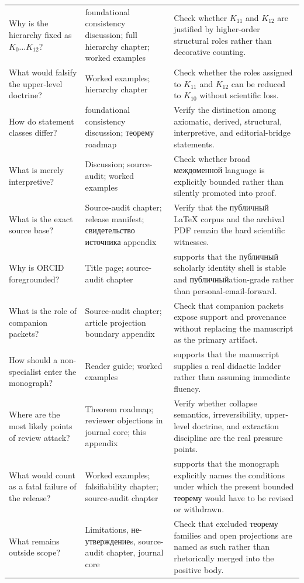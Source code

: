 \begin{longtable}{p{3.4cm} p{4.4cm} p{5.7cm}}
Why is the hierarchy fixed as \(K_0\dots K_{12}\)? & foundational consistency discussion; full hierarchy chapter; worked examples & Check whether \(K_{11}\) and \(K_{12}\) are justified by higher-order structural roles rather than decorative counting. \\
What would falsify the upper-level doctrine? & Worked examples; hierarchy chapter & Check whether the roles assigned to \(K_{11}\) and \(K_{12}\) can be reduced to \(K_{10}\) without scientific loss. \\
How do statement classes differ? & foundational consistency discussion; теорему roadmap & Verify the distinction among axiomatic, derived, structural, interpretive, and editorial-bridge statements. \\
What is merely interpretive? & Discussion; source-audit; worked examples & Check whether broad междоменной language is explicitly bounded rather than silently promoted into proof. \\
What is the exact source base? & Source-audit chapter; release manifest; свидетельство источника appendix & Verify that the публичный LaTeX corpus and the archival PDF remain the hard scientific witnesses. \\
Why is ORCID foregrounded? & Title page; source-audit chapter & supports that the публичный scholarly identity shell is stable and публичныйation-grade rather than personal-email-forward. \\
What is the role of companion packets? & Source-audit chapter; article projection boundary appendix & Check that companion packets expose support and provenance without replacing the manuscript as the primary artifact. \\
How should a non-specialist enter the monograph? & Reader guide; worked examples & supports that the manuscript supplies a real didactic ladder rather than assuming immediate fluency. \\
Where are the most likely points of review attack? & Theorem roadmap; reviewer objections in journal core; this appendix & Verify whether collapse semantics, irreversibility, upper-level doctrine, and extraction discipline are the real pressure points. \\
What would count as a fatal failure of the release? & Worked examples; falsifiability chapter; source-audit chapter & supports that the monograph explicitly names the conditions under which the present bounded теорему would have to be revised or withdrawn. \\
What remains outside scope? & Limitations, не-утверждениеs, source-audit chapter, journal core & Check that excluded теорему families and open projections are named as such rather than rhetorically merged into the positive body. \\
\end{longtable}

